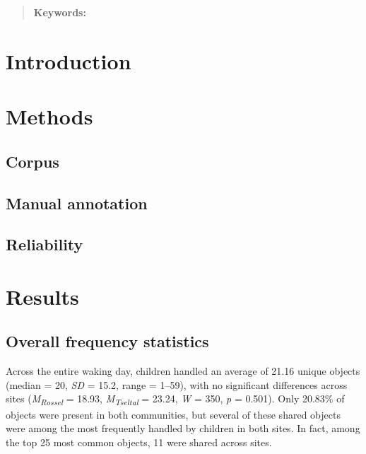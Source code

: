 \documentclass[10pt, letterpaper]{article}
\title{}
\begin{document}
\maketitle

\begin{abstract}


\textbf{Keywords:}

\end{abstract}

\hypertarget{introduction}{%
\section{Introduction}\label{introduction}}

\hypertarget{methods}{%
\section{Methods}\label{methods}}

\hypertarget{corpus}{%
\subsection{Corpus}\label{corpus}}

\hypertarget{manual-annotation}{%
\subsection{Manual annotation}\label{manual-annotation}}

\hypertarget{reliability}{%
\subsection{Reliability}\label{reliability}}

\hypertarget{results}{%
\section{Results}\label{results}}

\hypertarget{overall-frequency-statistics}{%
\subsection{Overall frequency
statistics}\label{overall-frequency-statistics}}

Across the entire waking day, children handled an average of 21.16
unique objects (median = 20, \emph{SD} = 15.2, range = 1--59), with no
significant differences across sites
(\emph{M}\textsubscript{\emph{Rossel}} = 18.93,
\emph{M}\textsubscript{\emph{Tseltal}} = 23.24, \emph{W} = 350, \emph{p}
= 0.501). Only 20.83\% of objects were present in both communities, but
several of these shared objects were among the most frequently handled
by children in both sites. In fact, among the top 25 most common
objects, 11 were shared across sites.
\end{document}
